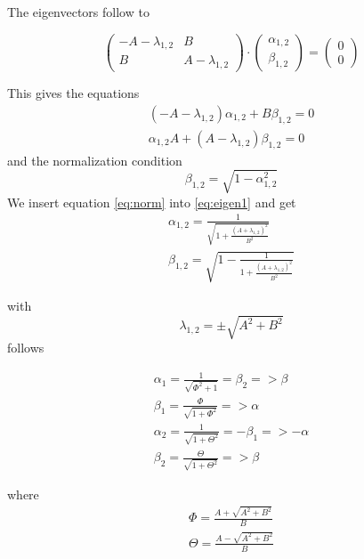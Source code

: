 The eigenvectors follow to

\begin{equation}
\begin{pmatrix}
-A-\lambda_{1,2} & B\\
B & A-\lambda_{1,2}
\end{pmatrix} \cdot 
\begin{pmatrix}
\alpha_{1,2} \\ \beta_{1,2}
\end{pmatrix} =
\begin{pmatrix}
0 \\ 0
\end{pmatrix}
\end{equation}

This gives the equations 
\begin{eqnarray}
\left(-A-\lambda_{1,2}\right)\alpha_{1,2}+B\beta_{1,2}=0 \label{eq:eigen1}\\
\alpha_{1,2}A+\left(A-\lambda_{1,2}\right)\beta_{1,2}=0
\end{eqnarray}
and the normalization condition
\begin{equation}\label{eq:norm}
\beta_{1,2}=\sqrt{1-\alpha_{1,2}^2}
\end{equation}
We insert equation \eqref{eq:norm} into \eqref{eq:eigen1} and get
\begin{eqnarray}
\alpha_{1,2}=\frac{1}{\sqrt{1+\frac{\left(A+\lambda_{1,2}\right)^2}{B^2}}}\\
\beta_{1,2}=\sqrt{1-\frac{1}{1+\frac{\left(A+\lambda_{1,2}\right)^2}{B^2}}}
\end{eqnarray}

with 
\begin{equation}
\lambda_{1,2}=\pm\sqrt{A^2+B^2}
\end{equation}
follows

\begin{eqnarray}\label{eq:ab}
\alpha_{1}=\frac{1}{\sqrt{\Phi^2+1}}=\beta_2=>\beta\\
\beta_{1}=\frac{\Phi}{\sqrt{1+\Phi^2}}=>\alpha\\
\alpha_{2}=\frac{1}{\sqrt{1+\Theta^2}}=-\beta_1=>-\alpha\\
\beta_{2}=\frac{\Theta}{\sqrt{1+\Theta^2}}=>\beta
\end{eqnarray}

where \begin{eqnarray}\label{eq:abcont}
\Phi=\frac{A+\sqrt{A^2+B^2}}{B}\\
\Theta=\frac{A-\sqrt{A^2+B^2}}{B}
\end{eqnarray}

